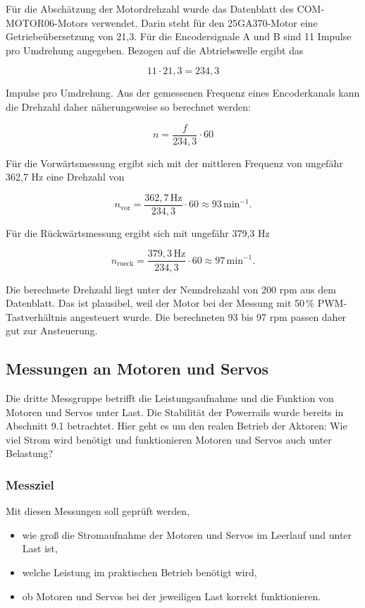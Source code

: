 Für die Abschätzung der Motordrehzahl wurde das Datenblatt des COM-MOTOR06-Motors verwendet. Darin steht für den 25GA370-Motor eine Getriebeübersetzung von 21,3. Für die Encodersignale A und B sind 11 Impulse pro Umdrehung angegeben. Bezogen auf die Abtriebswelle ergibt das

\[
11 \cdot 21{,}3 = 234{,}3
\]

Impulse pro Umdrehung. Aus der gemessenen Frequenz eines Encoderkanals kann die Drehzahl daher näherungsweise so berechnet werden:

\[
n = \frac{f}{234{,}3} \cdot 60
\]

Für die Vorwärtsmessung ergibt sich mit der mittleren Frequenz von ungefähr 362,7 Hz eine Drehzahl von

\[
n_\mathrm{vor} = \frac{362{,}7\,\mathrm{Hz}}{234{,}3} \cdot 60 \approx 93\,\mathrm{min}^{-1}.
\]

Für die Rückwärtsmessung ergibt sich mit ungefähr 379,3 Hz

\[
n_\mathrm{rueck} = \frac{379{,}3\,\mathrm{Hz}}{234{,}3} \cdot 60 \approx 97\,\mathrm{min}^{-1}.
\]

Die berechnete Drehzahl liegt unter der Nenndrehzahl von 200 rpm aus dem Datenblatt. Das ist plausibel, weil der Motor bei der Messung mit 50\,\% PWM-Tastverhältnis angesteuert wurde. Die berechneten 93 bis 97 rpm passen daher gut zur Ansteuerung.

\subsection{Messungen an Motoren und Servos}
Die dritte Messgruppe betrifft die Leistungsaufnahme und die Funktion von Motoren und Servos unter Last. Die Stabilität der Powerrails wurde bereits in Abschnitt 9.1 betrachtet. Hier geht es um den realen Betrieb der Aktoren: Wie viel Strom wird benötigt und funktionieren Motoren und Servos auch unter Belastung?

\subsubsection{Messziel}
Mit diesen Messungen soll geprüft werden,

\begin{itemize}
	\item wie groß die Stromaufnahme der Motoren und Servos im Leerlauf und unter Last ist,
	\item welche Leistung im praktischen Betrieb benötigt wird,
	\item ob Motoren und Servos bei der jeweiligen Last korrekt funktionieren.
\end{itemize}


